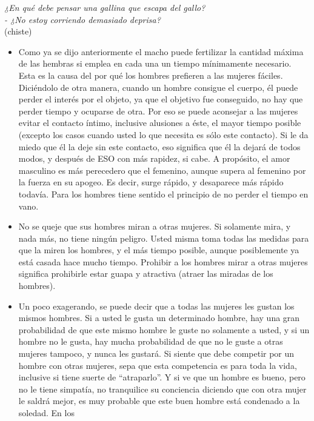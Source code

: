 \noindent
\textit{¿En qué debe pensar una gallina que escapa del gallo?}\\
\textit{- ¿No estoy corriendo demasiado deprisa?}\\
(chiste)\\



\begin{itemize}
\item
  Como ya se dijo anteriormente el macho puede fertilizar la cantidad
  máxima de las hembras si emplea en cada una un tiempo mínimamente
  necesario. Esta es la causa del por qué los hombres prefieren a las
  mujeres fáciles. Diciéndolo de otra manera, cuando un hombre consigue
  el cuerpo, él puede perder el interés por el objeto, ya que el
  objetivo fue conseguido, no hay que perder tiempo y ocuparse de otra.
  Por eso se puede aconsejar a las mujeres evitar el contacto íntimo,
  inclusive alusiones a éste, el mayor tiempo posible (excepto los casos
  cuando usted lo que necesita es sólo este contacto). Si le da miedo
  que él la deje sin este contacto, eso significa que él la dejará de
  todos modos, y después de ESO con más rapidez, si cabe. A propósito,
  el amor masculino es más perecedero que el femenino, aunque supera al
  femenino por la fuerza en su apogeo. Es decir, surge rápido, y
  desaparece más rápido todavía. Para los hombres tiene sentido el
  principio de no perder el tiempo en vano.
\item
  No se queje que sus hombres miran a otras mujeres. Si solamente mira,
  y nada más, no tiene ningún peligro. Usted misma toma todas las
  medidas para que la miren los hombres, y el más tiempo posible, aunque
  posiblemente ya está casada hace mucho tiempo. Prohibir a los hombres
  mirar a otras mujeres significa prohibirle estar guapa y atractiva
  (atraer las miradas de los hombres).
\item
  Un poco exagerando, se puede decir que a todas las mujeres les gustan
  los mismos hombres. Si a usted le gusta un determinado hombre, hay una
  gran probabilidad de que este mismo hombre le guste no solamente a
  usted, y si un hombre no le gusta, hay mucha probabilidad de que no le
  guste a otras mujeres tampoco, y nunca les gustará. Si siente que debe
  competir por un hombre con otras mujeres, sepa que esta competencia es
  para toda la vida, inclusive si tiene suerte de ``atraparlo''. Y si ve
  que un hombre es bueno, pero no le tiene simpatía, no tranquilice su
  conciencia diciendo que con otra mujer le saldrá mejor, es muy
  probable que este buen hombre está condenado a la soledad. En los

\end{itemize}
